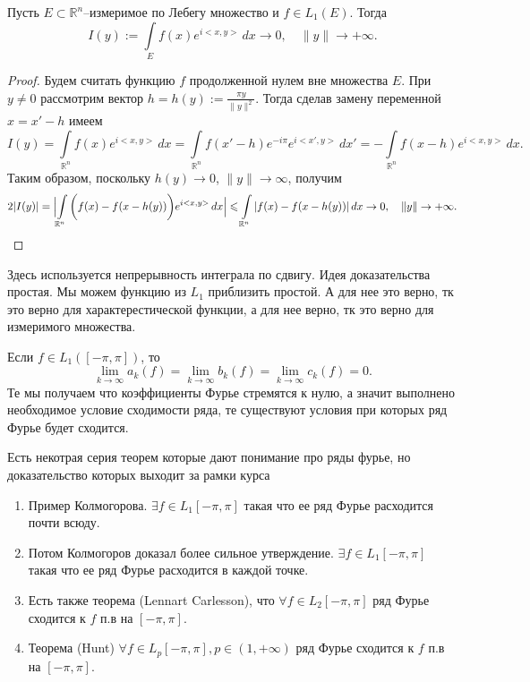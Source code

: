 \begin{theorem}
Пусть $E \subset \mathbb{R}^{n}$--измеримое по Лебегу множество и $f \in L_{1}(E)$. Тогда
\begin{equation}
\label{Th.Riemann_Lebesgue}
I(y):=\int\limits_{E}f(x)e^{i<x,y>}\,dx \to 0, \quad \|y\| \to +\infty.
\end{equation}
\end{theorem}
\begin{proof}
    Будем считать функцию $f$ продолженной нулем вне множества $E$. 
При $y \neq 0$ рассмотрим вектор $h=h(y):=\frac{\pi y}{\|y\|^{2}}$.
Тогда сделав замену переменной $x=x'-h$ имеем
$$
I(y)=\int\limits_{\mathbb{R}^{n}}f(x)e^{i<x,y>}\,dx = \int\limits_{\mathbb{R}^{n}}f(x'-h)e^{-i\pi}e^{i<x',y>}\,dx' = -\int\limits_{\mathbb{R}^{n}}f(x-h)e^{i<x,y>}\,dx.
$$
Таким образом, поскольку $h(y) \to 0$, $\|y\| \to \infty$, получим
\begin{equation}
2|I(y)| = \Bigl|\int\limits_{\mathbb{R}^{n}}\bigg(f(x)-f(x-h(y))\bigg)e^{i<x,y>}\,dx\Bigr| \le \int\limits_{\mathbb{R}^{n}}|f(x)-f(x-h(y))|\,dx \to 0, \quad \|y\| \to +\infty.
\end{equation}
\end{proof}
\begin{note}
    Здесь используется непрерывность интеграла по сдвигу. Идея доказательства простая. Мы можем функцию из $L_1$ приблизить простой. А для нее это верно, тк это верно для характерестической функции, а для нее верно, тк это верно для измеримого множества.
\end{note}



\begin{corollary}
Если $f \in L_{1}([-\pi,\pi])$, то 
$$
\lim\limits_{k \to \infty}a_{k}(f) = \lim\limits_{k \to \infty}b_{k}(f) = \lim\limits_{k \to \infty}c_{k}(f) = 0.
$$
Те мы получаем что коэффициенты Фурье стремятся к нулю, а значит выполнено необходимое условие сходимости ряда, те существуют условия при которых ряд Фурье будет сходится. 
\end{corollary}
\begin{note}
    Есть некотрая серия теорем которые дают понимание про ряды фурье, но доказательство которых выходит за рамки курса
    \begin{enumerate}
        \item Пример Колмогорова. $\exists f \in L_1[-\pi,\pi]$ такая что ее ряд Фурье расходится почти всюду.
        \item Потом Колмогоров доказал более сильное утверждение. $\exists f \in L_1[-\pi,\pi]$ такая что ее ряд Фурье расходится в каждой точке.
        \item  Есть также теорема (Lennart Carlesson), что $\forall f \in L_2[-\pi,\pi]$ ряд Фурье сходится к $f$ п.в на $[-\pi,\pi]$.
        \item Теорема (Hunt) $\forall f \in L_p[-\pi,\pi], p \in (1, +\infty)$ ряд Фурье сходится к $f$ п.в на $[-\pi,\pi]$.
    \end{enumerate}
     


\end{note}

